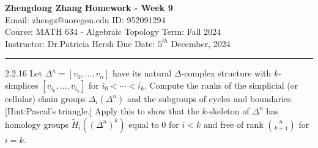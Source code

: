 \documentclass[a4paper, 12pt]{article}
\begin{document}
\noindent
\large\textbf{Zhengdong Zhang} \hfill \textbf{Homework - Week 9}   \\
Email: zhengz@uoregon.edu \hfill ID: 952091294 \\
\normalsize Course: MATH 634 - Algebraic Topology  \hfill Term: Fall 2024\\
Instructor: Dr.Patricia Hersh \hfill Due Date: $5^{th}$ December, 2024 \\
\noindent\rule{7in}{2.8pt}
\begin{problem}{2.2.16}
Let \(\Delta^n=[v_0,\ldots,v_n]\) have its natural \(\Delta\)-complex structure with \(k\)-simplices \([v_{i_0},\ldots,v_{i_k}]\) for \(i_0<\cdots<i_k\). Compute the ranks of the 
simplicial (or cellular) chain groups \(\Delta_i(\Delta^n)\) and the subgroups of cycles and boundaries. [Hint:Pascal's triangle.] Apply this to show that the \(k\)-skeleton of \(\Delta^n\) has 
homology groups \(\tilde{H}_i((\Delta^n)^k)\) equal to 0 for \(i<k\) and free of rank \(\binom{n}{k+1}\) for \(i=k\).
\end{problem}
\end{document}
